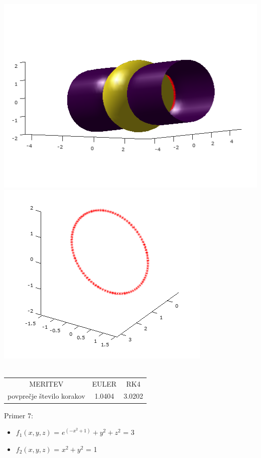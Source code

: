 \documentclass[]{article}
\begin{document}
	\includegraphics[scale=0.3]{primer6_3}
	\includegraphics[scale=0.3]{primer6_4} \\ \\
	\begin{center}
	\begin{tabular}{ |c|c|c| } 
 		\hline
 			MERITEV & EULER & RK4 \\ 
			povpre\v{c}je \v{s}tevilo korakov & 1.0404 & 3.0202 \\ 
 		\hline
 	\end{tabular}
	\end{center}
	Primer 7:
	\begin{itemize}  
		\item $f_{1}(x,y,z)$ = $e^{(-x^{2}+1)}+y^{2}+z^{2}$ = 3
		\item $f_{2}(x,y,z)$ =  $x^2 + y^2$ = 1
	\end{itemize}
\end{document}

